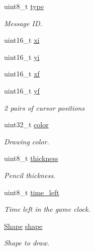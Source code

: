 \begin{DoxyCompactItemize}
\item 
uint8\+\_\+t \mbox{\hyperlink{group__uart__wordgame_ga620cb65b8b21f7759e3d524baca5d4d9}{type}}
\begin{DoxyCompactList}\small\item\em Message ID. \end{DoxyCompactList}\item 
uint16\+\_\+t \mbox{\hyperlink{group__uart__wordgame_gad44fda3c5128884f864a3304cea15223}{xi}}
\item 
uint16\+\_\+t \mbox{\hyperlink{group__uart__wordgame_gaa122ebaa3ea886f2d646562abe6b7bae}{yi}}
\item 
uint16\+\_\+t \mbox{\hyperlink{group__uart__wordgame_gaf730ea29c7bd3292cf775a4bd27ee754}{xf}}
\item 
uint16\+\_\+t \mbox{\hyperlink{group__uart__wordgame_ga2c627a100a7a97b45a8a96bfd6194e26}{yf}}
\begin{DoxyCompactList}\small\item\em 2 pairs of cursor positions \end{DoxyCompactList}\item 
uint32\+\_\+t \mbox{\hyperlink{group__uart__wordgame_gaf63ceb10b5565e8d603be982db362f98}{color}}
\begin{DoxyCompactList}\small\item\em Drawing color. \end{DoxyCompactList}\item 
uint8\+\_\+t \mbox{\hyperlink{group__uart__wordgame_gac30bc759eb1783575a370cf80eef8b75}{thickness}}
\begin{DoxyCompactList}\small\item\em Pencil thickness. \end{DoxyCompactList}\item 
uint8\+\_\+t \mbox{\hyperlink{group__uart__wordgame_ga93b24ec1227430152c347672090d0723}{time\+\_\+left}}
\begin{DoxyCompactList}\small\item\em Time left in the game clock. \end{DoxyCompactList}\item 
\mbox{\hyperlink{group__canvas_ga55b506070847a13554f8b879c1bfb37c}{Shape}} \mbox{\hyperlink{group__uart__wordgame_ga7475f18f59857fa2012597615624a3a9}{shape}}
\begin{DoxyCompactList}\small\item\em Shape to draw. \end{DoxyCompactList}\item 

\end{DoxyCompactItemize}

